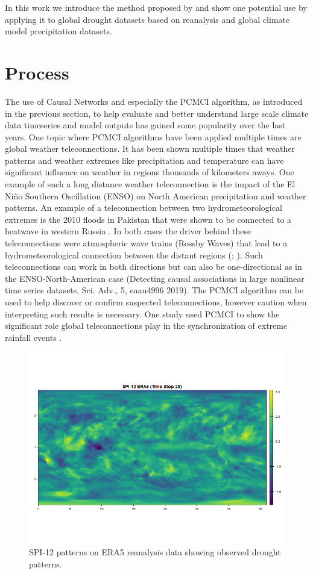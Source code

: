 \documentclass[
]{krantz}
\begin{document}
In this work we introduce the method proposed by \citep{nowack2020} and show one potential use by applying it to global drought datasets based on reanalysis and global climate model precipitation datasets.

\section{Process}\label{process}

The use of Causal Networks and especially the PCMCI algorithm, as introduced in the previous section, to help evaluate and better understand large scale climate data timeseries and model outputs has gained some popularity over the last years. One topic where PCMCI algorithms have been applied multiple times are global weather teleconnections. It has been shown multiple times that weather patterns and weather extremes like precipitation and temperature can have significant influence on weather in regions thousands of kilometers aways.
One example of such a long distance weather teleconnection is the impact of the El Niño Southern Oscillation (ENSO) on North American precipitation and weather patterns\citep{ropelewski1986}. An example of a teleconnection between two hydrometeorological extremes is the 2010 floods in Pakistan that were shown to be connected to a heatwave in western Russia \citep{lau2012}. In both cases the driver behind these teleconnections were atmospheric wave trains (Rossby Waves) that lead to a hydrometeorological connection between the distant regions (\citet{lau2012}; \citet{ropelewski1986}). Such teleconnections can work in both directions but can also be one-directional as in the ENSO-North-American case (Detecting causal associations in large nonlinear time series datasets, Sci. Adv., 5, eaau4996 2019). The PCMCI algorithm can be used to help discover or confirm suspected teleconnections, however caution when interpreting such results is necessary. One study used PCMCI to show the significant role global teleconnections play in the synchronization of extreme rainfall events \citep{boers2019}.

\begin{figure}

{\centering \includegraphics[width=0.49\linewidth]{work/02-causaldisc/figures/ERA5/spi_era5_plot} 

}

\caption{SPI-12 patterns on ERA5 reanalysis data showing observed drought patterns.}\label{fig:figure9}
\end{figure}
\end{document}
